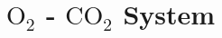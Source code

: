 \documentclass[../main]{subfiles}
\begin{document}
\chapter{$\mbox{O}_2$ - $\mbox{CO}_2$ System} \label{chp:}




\end{document}

